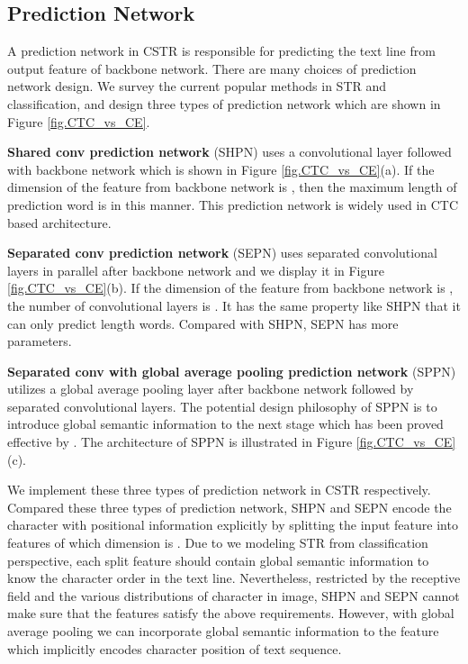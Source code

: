 \documentclass[final]{cvpr}
\begin{document}
\subsection{Prediction Network}
A prediction network in CSTR is responsible for predicting the text line from output feature of backbone network. There are many choices of prediction network design. We survey the current popular methods in STR and classification, and design three types of prediction network which are shown in Figure \ref{fig.CTC_vs_CE}.

\textbf{Shared conv prediction network} (SHPN) uses a convolutional layer followed with backbone network which is shown in Figure \ref{fig.CTC_vs_CE}(a). If the dimension of the feature from backbone network is , then the maximum length of prediction word is  in this manner. This prediction network is widely used in CTC based architecture\cite{baek2019wrong, borisyuk2018rosetta}.

\textbf{Separated conv prediction network} (SEPN) uses separated convolutional layers in parallel after backbone network and we display it in Figure \ref{fig.CTC_vs_CE}(b). If the dimension of the feature from backbone network is , the number of convolutional layers is . It has the same property like SHPN that it can only predict  length words. Compared with SHPN, SEPN has more parameters.

\textbf{Separated conv with global average pooling prediction network} (SPPN) utilizes a global average pooling layer after backbone network followed by separated convolutional layers. The potential design philosophy of SPPN is to introduce global semantic information to the next stage which has been proved effective by \cite{yu2020towards}. The architecture of SPPN is illustrated in Figure \ref{fig.CTC_vs_CE}(c).

We implement these three types of prediction network in CSTR respectively. Compared these three types of prediction network, SHPN and SEPN encode the character with positional information explicitly by splitting the input feature into  features of which dimension is . Due to we modeling STR from classification perspective, each split feature should contain global semantic information to know the character order in the text line.
Nevertheless, restricted by the receptive field and the various distributions of character in image, SHPN and SEPN cannot make sure that the features satisfy the above requirements. However, with global average pooling we can incorporate global semantic information to the feature which implicitly encodes character position of text sequence.
\end{document}

